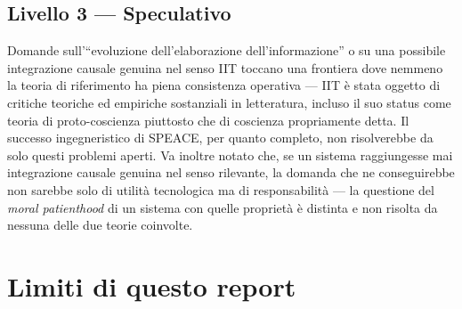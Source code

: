 \documentclass[11pt,a4paper]{article}
\begin{document}
\subsection{Livello 3 --- Speculativo}

Domande sull'``evoluzione dell'elaborazione dell'informazione'' o su una possibile integrazione causale genuina nel senso IIT toccano una frontiera dove nemmeno la teoria di riferimento ha piena consistenza operativa --- IIT \`e stata oggetto di critiche teoriche ed empiriche sostanziali in letteratura, incluso il suo status come teoria di proto-coscienza piuttosto che di coscienza propriamente detta. Il successo ingegneristico di SPEACE, per quanto completo, non risolverebbe da solo questi problemi aperti. Va inoltre notato che, se un sistema raggiungesse mai integrazione causale genuina nel senso rilevante, la domanda che ne conseguirebbe non sarebbe solo di utilit\`a tecnologica ma di responsabilit\`a --- la questione del \emph{moral patienthood} di un sistema con quelle propriet\`a \`e distinta e non risolta da nessuna delle due teorie coinvolte.

\section{Limiti di questo report}
\label{sec:limits}
\end{document}
